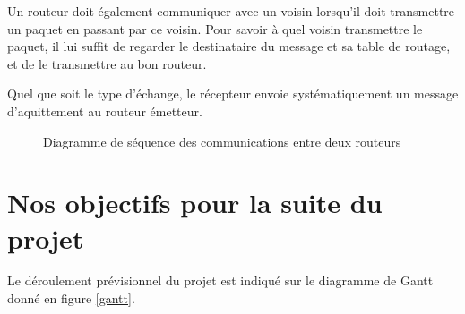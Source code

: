 \documentclass[a4paper,11pt]{article}
\begin{document}
Un routeur doit également communiquer avec un voisin lorsqu'il doit transmettre un paquet en passant par ce voisin. Pour savoir à quel voisin transmettre le paquet, il lui suffit de regarder le destinataire du message et sa table de routage, et de le transmettre au bon routeur.

Quel que soit le type d'échange, le récepteur envoie systématiquement un message d'aquittement au routeur émetteur.

\begin{figure}[H]
\begin{center}
\caption{Diagramme de séquence des communications entre deux routeurs}
\end{center}
\end{figure}

\section{Nos objectifs pour la suite du projet}

Le déroulement prévisionnel du projet est indiqué sur le diagramme de Gantt donné en figure \ref{gantt}.
\end{document}
